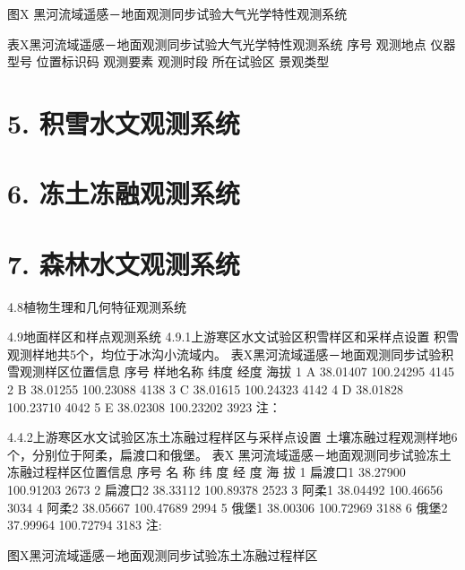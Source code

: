 \documentclass[letterpaper,10pt,english]{sphinxmanual}
\begin{document}
图X 黑河流域遥感－地面观测同步试验大气光学特性观测系统

表X黑河流域遥感－地面观测同步试验大气光学特性观测系统
序号      观测地点    仪器型号    位置标识码   观测要素    观测时段    所在试验区   景观类型


\section{5. 积雪水文观测系统}
\label{water_observe_system:id6}

\section{6. 冻土冻融观测系统}
\label{water_observe_system:id7}

\section{7. 森林水文观测系统}
\label{water_observe_system:id8}
4.8植物生理和几何特征观测系统

4.9地面样区和样点观测系统
4.9.1上游寒区水文试验区积雪样区和采样点设置
积雪观测样地共5个，均位于冰沟小流域内。
表X黑河流域遥感－地面观测同步试验积雪观测样区位置信息
序号      样地名称    纬度      经度      海拔
1       A       38.01407        100.24295       4145
2       B       38.01255        100.23088       4138
3       C       38.01615        100.24323       4142
4       D       38.01828        100.23710       4042
5       E       38.02308        100.23202       3923
注：

4.4.2上游寒区水文试验区冻土冻融过程样区与采样点设置
土壤冻融过程观测样地6个，分别位于阿柔，扁渡口和俄堡。
表X 黑河流域遥感－地面观测同步试验冻土冻融过程样区位置信息
序号      名 称     纬 度     经 度     海 拔
1       扁渡口1    38.27900        100.91203       2673
2       扁渡口2    38.33112        100.89378       2523
3       阿柔1     38.04492        100.46656       3034
4       阿柔2     38.05667        100.47689       2994
5       俄堡1     38.00306        100.72969       3188
6       俄堡2     37.99964        100.72794       3183
注:

图X黑河流域遥感－地面观测同步试验冻土冻融过程样区
\end{document}
